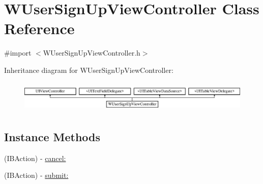 \hypertarget{interface_w_user_sign_up_view_controller}{\section{W\-User\-Sign\-Up\-View\-Controller Class Reference}
\label{interface_w_user_sign_up_view_controller}
}


{\ttfamily \#import $<$W\-User\-Sign\-Up\-View\-Controller.\-h$>$}

Inheritance diagram for W\-User\-Sign\-Up\-View\-Controller\-:\begin{figure}[H]
\begin{center}
\leavevmode
\includegraphics[height=1.546961cm]{interface_w_user_sign_up_view_controller}
\end{center}
\end{figure}
\subsection*{Instance Methods}
\begin{DoxyCompactItemize}
\item 
(I\-B\-Action) -\/ \hyperlink{interface_w_user_sign_up_view_controller_a86fac87e46dfec05e17bd09511d9f9eb}{cancel\-:}
\item 
(I\-B\-Action) -\/ \hyperlink{interface_w_user_sign_up_view_controller_ae89165ad53d78c7d25bd6230c927fec1}{submit\-:}
\end{DoxyCompactItemize}
